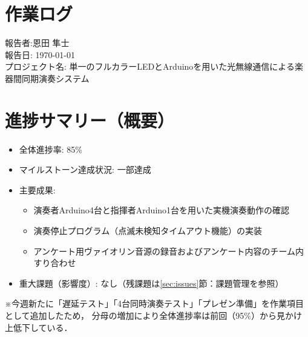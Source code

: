 \documentclass[lualatex,paper=a4paper,jafontsize=11.5pt,jafontscale=1.05]{jlreq}
\begin{document}
\section*{作業ログ}
\noindent
報告者:恩田 隼士\\
報告日: \today \\
プロジェクト名: 単一のフルカラーLEDとArduinoを用いた光無線通信による楽器間同期演奏システム \\
\hrulefill

\section{進捗サマリー（概要）}
\begin{itemize}
 \item 全体進捗率: 85\%
 \item マイルストーン達成状況: 一部達成
 \item 主要成果:
 \begin{itemize}
    \item 演奏者Arduino4台と指揮者Arduino1台を用いた実機演奏動作の確認
    \item 演奏停止プログラム（点滅未検知タイムアウト機能）の実装
    \item アンケート用ヴァイオリン音源の録音およびアンケート内容のチーム内すり合わせ
 \end{itemize}
 \item 重大課題（影響度）: なし（残課題は\ref{sec:issues}節：課題管理を参照）
\end{itemize}

\noindent
※今週新たに「遅延テスト」「4台同時演奏テスト」「プレゼン準備」を作業項目として追加したため，
分母の増加により全体進捗率は前回（95\%）から見かけ上低下している．
\end{document}
